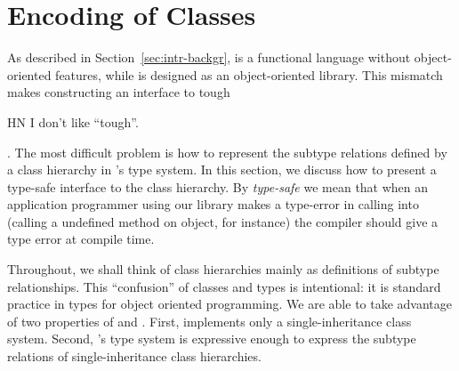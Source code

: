 \documentclass[finalversion]{usetex-v1}
\begin{document}

\section{Encoding of Classes}
\label{sec:encoding-classes}

As described in Section~\ref{sec:intr-backgr}, \sml is a functional
language without object-oriented features, while \gtk is designed as an
object-oriented library.  This mismatch makes constructing an \sml
interface to \gtk tough \begin{ednote}{HN} I don't like ``tough''.\end{ednote}.  The most difficult problem is how to represent the
subtype relations defined by a class hierarchy in \sml's type system.
In this section, we discuss how to present a
type-safe \sml interface to the \gtk class hierarchy.  By \emph{type-safe} we
mean that when an \sml application programmer using our library
makes a type-error in calling into \gtk (calling a undefined
method on object, for instance) the \sml compiler should give a
type error at compile time.

Throughout, we shall think of class hierarchies mainly as definitions
of subtype relationships.  This ``confusion'' of classes and types is
intentional: it is standard practice in types for object
oriented programming.
We are able to take advantage of two properties of \gtk
and \sml.  First, \gtk implements only a single-inheritance
class system.
Second, \sml's type system is expressive enough
to express the subtype relations of single-inheritance class
hierarchies.
\end{document}
